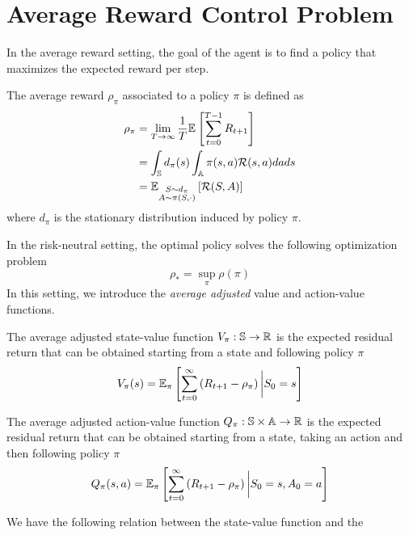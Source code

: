 \documentclass[a4paper,11pt]{article}
\begin{document}
\section{Average Reward Control Problem}
In the average reward setting, the goal of the agent is to find a policy that
maximizes the expected reward per step. 
\begin{definition}
	The average reward $\rho_\pi$ associated to a policy $\pi$ is defined as  
	\begin{equation}
		\begin{split}
			\rho_\pi &= \lim_{T\to\infty} \frac{1}{T} \E{ \sum^{T-1}_{t=0} R_{t+1}}\\
					 &= \int_\S d_\pi(s) \int_\A \pi(s, a) \calR(s,a) da ds\\
					 &= \E[\substack{S\sim d_\pi \\ A \sim \pi(S,
						\cdot)}]{\calR(S,A)}
		\end{split}
	\end{equation}
where $d_\pi$ is the stationary distribution induced by policy $\pi$.
\end{definition}
In the risk-neutral setting, the optimal policy solves the following
optimization problem  
\begin{equation}
	\rho_* = \sup_\pi \rho(\pi)
\end{equation}
In this setting, we introduce the \emph{average adjusted} value and action-value 
functions. 
\begin{definition}
	The average adjusted state-value function $V_\pi : \S \to \R$ is the
	expected residual return that can be obtained starting from a state and
	following policy $\pi$
	\begin{equation}
		V_\pi(s) = \E[\pi]{\sum^{\infty}_{t=0} \left(R_{t+1} - \rho_\pi\right)
		\bigg| S_0 = s}
	\end{equation}
\end{definition}
\begin{definition}
	The average adjusted action-value function $Q_\pi : \S \times \A \to \R$ is 
	the expected residual return that can be obtained starting from a state,
	taking an action and then following policy $\pi$
	\begin{equation}
		Q_\pi(s, a) = \E[\pi]{\sum^{\infty}_{t=0} \left(R_{t+1} -
			\rho_\pi\right) \bigg| S_0 = s, A_0
		= a}
	\end{equation}
\end{definition}
We have the following relation between the state-value function and the
\end{document}
